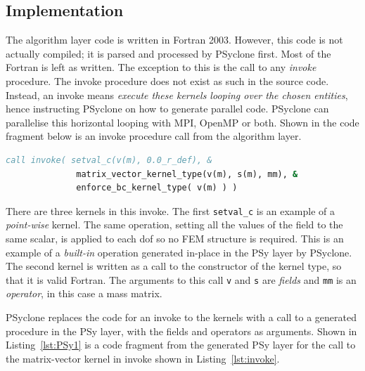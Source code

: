 \documentclass[review,times]{elsarticle}
\begin{document}
\subsection{\label{sec:sub:implement}Implementation}

The algorithm layer code is written in Fortran 2003. However, this
code is not actually compiled; it is parsed and processed by PSyclone
first. Most of the Fortran is left as written. The exception to this
is the call to any {\em invoke} procedure. The invoke procedure does not 
exist as such in the source code. Instead, an invoke means {\em execute these
kernels looping over the chosen entities}, hence instructing PSyclone on how to 
generate parallel code. PSyclone can parallelise this horizontal looping with MPI,
OpenMP or both. Shown in the code fragment below is an invoke
procedure call from the algorithm layer.

\begin{lstlisting}[language=Fortran,caption={Code fragment showing an
invoke procedure from the Algorithm layer},label={lst:invoke}]
 call invoke( setval_c(v(m), 0.0_r_def), &
              matrix_vector_kernel_type(v(m), s(m), mm), &
              enforce_bc_kernel_type( v(m) ) )
\end{lstlisting}

There are three kernels in this invoke. The first \verb+setval_c+ is
an example of a {\em point-wise} kernel. The same operation, setting all
the values of the field to the same scalar, is applied to each dof so no 
FEM structure is required. This is an example of a {\em built-in} operation 
generated in-place in the PSy layer by PSyclone. The second
kernel is written as a call to the constructor of the kernel type, so that it is
valid Fortran. The arguments to this call \verb+v+ and \verb+s+ are
{\em fields} and \verb+mm+ is an {\em operator}, in this case a mass
matrix.

PSyclone replaces the code for an invoke to the kernels with a call to a
generated procedure in the PSy layer, with the fields and operators as
arguments. Shown in Listing~\ref{lst:PSy1} is a code fragment from the generated PSy layer for
the call to the matrix-vector kernel in invoke shown in Listing~\ref{lst:invoke}.
\end{document}
